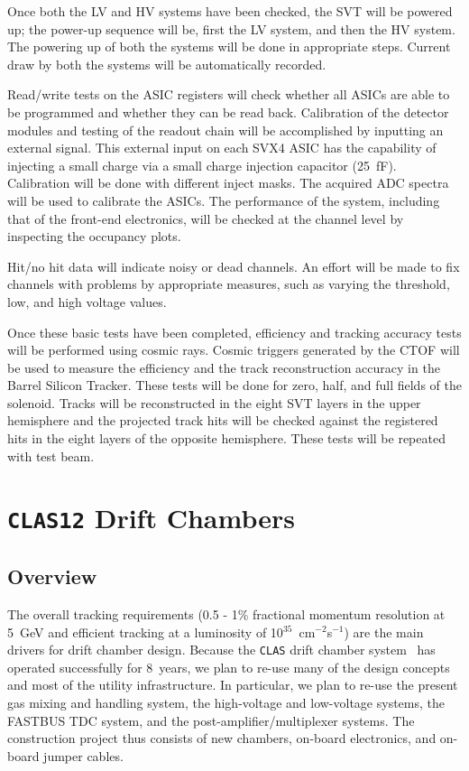 Once both the LV and HV systems have been checked, the SVT will be powered
up; the power-up sequence will be, first the LV system, and then the HV
system.  The powering up of both the systems will be done in appropriate steps.
Current draw by both the systems will be automatically recorded.

Read/write tests on the ASIC registers will check whether all ASICs are able
to be programmed and whether they can be read back.  Calibration of the detector 
modules and testing of the readout chain will be accomplished by inputting an 
external signal.  This external input on each SVX4 ASIC has the capability of
injecting a small charge via a small charge injection capacitor (25~fF).  
Calibration will be done with different inject masks.  The acquired ADC spectra
will be used to calibrate the ASICs.  The performance of the system, including 
that of the front-end electronics, will be checked at the channel level by 
inspecting the occupancy plots.

Hit/no hit data will indicate noisy or dead channels.  An effort will be
made to fix channels with problems by appropriate measures, such as varying
the threshold, low, and high voltage values.

Once these basic tests have been completed, efficiency and tracking accuracy
tests will be performed using cosmic rays.  Cosmic triggers generated by the
CTOF will be used to measure the efficiency and the track reconstruction
accuracy in the Barrel Silicon Tracker.  These tests will be done for zero,
half, and full fields of the solenoid.  Tracks will be reconstructed in the
eight SVT layers in the upper hemisphere and the projected track hits will
be checked against the registered hits in the eight layers of the opposite
hemisphere.  These tests will be repeated with test beam.

\section{{\tt CLAS12} Drift Chambers}

\subsection{Overview}

The overall tracking requirements (0.5 -  1\% fractional momentum resolution 
at 5~GeV and efficient tracking at a luminosity of 
10$^{35}$~cm$^{-2}$s$^{-1}$) are the main drivers for drift chamber design.  
Because the {\tt CLAS} drift chamber system~\cite{dcnim} has operated 
successfully for 8~years, we plan to re-use many of the design concepts and 
most of the utility infrastructure.  In particular, we plan to re-use the 
present gas mixing and handling system, the high-voltage and low-voltage 
systems, the FASTBUS TDC system, and the post-amplifier/multiplexer systems.
The construction project thus consists of new chambers, on-board electronics, 
and on-board jumper cables.

